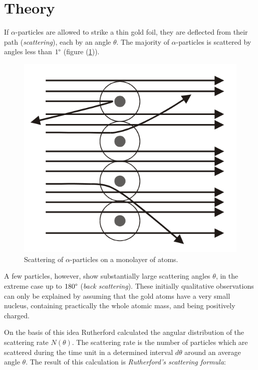 \documentclass[%
 reprint,
nofootinbib,
 amsmath,amssymb,
 aps,
floatfix,
]{revtex4-2}
\begin{document}
\section{Theory}
    If $\alpha$-particles are allowed to strike a thin gold foil, they are deflected from their path (\textit{scattering}), each by an angle $\theta$. The majority of $\alpha$-particles is scattered by angles less than $1 \degree$ (figure (\ref{fig:scattering})).
    \begin{figure}
        \centering
        \includegraphics[scale = 0.6]{Figures/scattering.png}
        \caption{Scattering of $\alpha$-particles on a monolayer of atoms.}
        \label{fig:scattering}
    \end{figure}
    \par
    A few particles, however, show substantially large scattering angles $\theta$, in the extreme case up to $180 \degree$ (\textit{back scattering}). These initially qualitative observations can only be explained by assuming that the gold atoms have a very small nucleus, containing practically the whole atomic mass, and being positively charged.
    \par
    On the basis of this idea Rutherford calculated the angular distribution of the scattering rate $N(\theta)$. The scattering rate is the number of particles which are scattered during the time unit in a determined interval $d \theta$ around an average angle $\theta$. The result of this calculation is \textit{Rutherford’s scattering formula}:
\end{document}
